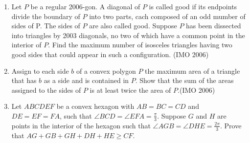 \begin{enumerate}[label=\thesubsection.\arabic*,ref=\thesubsection.\theenumi]
\item Let $P$ be a regular 2006-gon. A diagonal of $P$ is called good if its endpoints divide the boundary of $P$ into two parts, cach composed of an odd mumber of sides of P. The sides of $P$ are also called good. Suppose $P$ has been dissected into triangles by 2003 diagonals, no two of which have a common point in the interior of $P$. Find the maximum number  of isosceles triangles having two good sides that could appear in such a configuration. \hfill(IMO  2006)
\item Assign to each side $b$ of a convex polygon $P$ the maximum area of a triangle that has $b$ as a side and is contained in $P$. Show that the sum of the areas assigned to the sides of $P$ is at least twice the area of $P$.\hfill(IMO  2006)
\item Let $ABCDEF$ be a convex hexagon with $AB=BC=CD$ and $DE=EF=FA$, such that $\angle{BCD}=\angle{EFA}=\frac{\pi}{3}$. Suppose $G$ and $H$ are points in the interior of the hexagon such that $\angle{AGB}=\angle{DHE}=\frac{2\pi}{3}$. Prove that $AG+GB+GH+DH+HE\geq CF$.


\end{enumerate}
